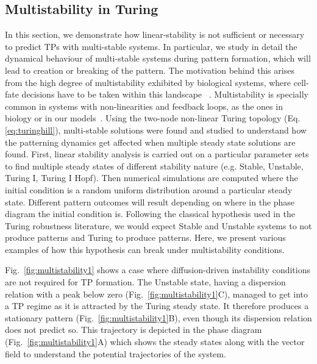 \subsection{Multistability in Turing}
In this section, we demonstrate how linear-stability is not sufficient or necessary to predict TPs with multi-stable systems.
In particular, we study in detail the dynamical behaviour of multi-stable systems during pattern formation, which will lead to creation or breaking of the pattern.
The motivation behind this arises from the high degree of multistability exhibited by biological systems, where cell-fate decisions have to be taken within this landscape ~\parencite{huang2000shape, moris2016transition}.
Multistability is specially common in systems with non-linearities and feedback loops, as the ones in biology or in our models~\parencite{pham2020complexity, leite2009multistability}.
Using the two-node non-linear Turing topology (Eq. \ref{eq:turinghill}), multi-stable solutions were found and studied to understand how the patterning dynamics get affected when multiple steady state solutions are found.
First, linear stability analysis is carried out on a particular parameter sets to find multiple steady states of different stability nature (e.g. Stable, Unstable, Turing I, Turing I Hopf).
Then numerical simulations are computed where the initial condition is a random uniform distribution around a particular steady state.
Different pattern outcomes will result depending on where in the phase diagram the initial condition is.
Following the classical hypothesis used in the Turing robustness literature, we would expect Stable and Unstable systems to not produce patterns and Turing to produce patterns.
Here, we present various examples of how this hypothesis can break under multistability conditions.

Fig.~\ref{fig:multistability1} shows a case where diffusion-driven instability conditions are not required for TP formation.
The Unstable state, having a dispersion relation with a peak below zero (Fig.~\ref{fig:multistability1}C), managed to get into a TP regime as it is attracted by the Turing steady state.
It therefore produces a stationary pattern (Fig.~\ref{fig:multistability1}B), even though its dispersion relation does not predict so.
This trajectory is depicted in the phase diagram (Fig.~\ref{fig:multistability1}A) which shows the steady states along with the vector field to understand the potential trajectories of the system.

